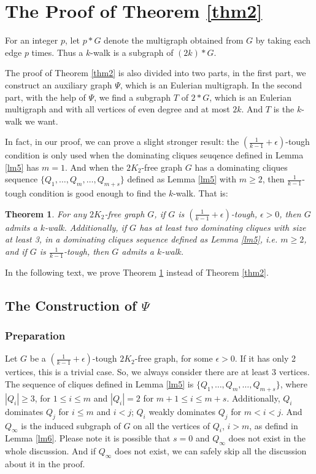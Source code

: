 \documentclass{amsart}
\newtheorem{theorem}{Theorem}
\begin{document}
\section{The Proof of Theorem \ref{thm2}}

For an integer $p$, let $p*G$ denote the multigraph obtained from $G$ by taking each edge $p$ times. 
Thus a $k$-walk is a subgraph of $(2k)*G$. 

The proof of Theorem \ref{thm2} is also divided into two parts, in the first part, we construct an auxiliary graph $\Psi$, which is an Eulerian multigraph. In the second part, with the help of $\Psi$, we find a subgraph $T$ of $2*G$, which is an Eulerian multigraph and with all vertices of even degree and at most $2k$. And $T$ is the $k$-walk we want.

In fact, in our proof, we can prove a slight stronger result: the $(\frac{1}{k-1}+\epsilon)$-tough condition is only used when the dominating cliques seuqence defined in Lemma \ref{lm5} has $m=1$. And when the $2K_2$-free graph $G$ has a dominating cliques sequence $\{Q_1,\ldots,Q_m,\ldots,Q_{m+s}\}$ defined as Lemma \ref{lm5} with $m\ge2$, then $\frac{1}{k-1}$-tough condition is good enough to find the $k$-walk. That is:
\begin{theorem}\label{opt}
For any $2K_2$-free graph $G$, if $G$ is $(\frac{1}{k-1}+\epsilon)$-tough, $\epsilon>0$, then $G$ admits a $k$-walk. Additionally, if $G$ has at least two dominating cliques with size at least 3, in a dominating cliques sequence defined as Lemma \ref{lm5}, i.e. $m\ge2$, and if $G$ is $\frac{1}{k-1}$-tough, then $G$ admits a $k$-walk.
\end{theorem}
In the following text, we prove Theorem \ref{opt} instead of Theorem \ref{thm2}.


\subsection{The Construction of $\Psi$}

\subsubsection{Preparation}

Let $G$ be a $(\frac{1}{k-1}+\epsilon)$-tough $2K_2$-free graph, for some $\epsilon>0$. If it has only 2 vertices, this is a trivial case. So, we always consider there are at least 3 vertices. The sequence of cliques defined in Lemma \ref{lm5} is $\{Q_1,\ldots,Q_m,\ldots,Q_{m+s}\}$, where $|Q_i|\ge3$, for $1\le i\le m$ and $|Q_i|=2$ for $m+1\le i\le m+s$. Additionally, $Q_i$ dominates $Q_j$ for $i\le m$ and $i<j$; $Q_i$ weakly dominates $Q_j$ for $m<i<j$. And $Q_{\infty}$ is the induced subgraph of $G$ on all the vertices of $Q_i$, $i>m$, as defind in Lemma \ref{lm6}. Please note it is possible that $s=0$ and $Q_{\infty}$ does not exist in the whole discussion. And if $Q_{\infty}$ does not exist, we can safely skip all the discussion about it in the proof.
\end{document}

